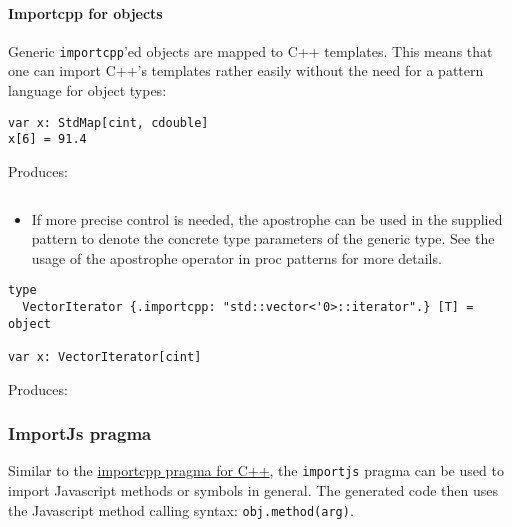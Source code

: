\hypertarget{importcpp-for-objects}{%
\paragraph{Importcpp for objects}\label{importcpp-for-objects}}

Generic \texttt{importcpp}'ed objects are mapped to C++ templates. This
means that one can import C++'s templates rather easily without the need
for a pattern language for object types:

\begin{verbatim}
var x: StdMap[cint, cdouble]
x[6] = 91.4
\end{verbatim}

Produces:

\begin{verbatim}
\end{verbatim}

\begin{itemize}
\tightlist
\item
  If more precise control is needed, the apostrophe
  \texttt{\textquotesingle{}} can be used in the supplied pattern to
  denote the concrete type parameters of the generic type. See the usage
  of the apostrophe operator in proc patterns for more details.
\end{itemize}

\begin{verbatim}
type
  VectorIterator {.importcpp: "std::vector<'0>::iterator".} [T] = object

var x: VectorIterator[cint]
\end{verbatim}

Produces:

\begin{Shaded}
\begin{Highlighting}[]
\end{Highlighting}
\end{Shaded}

\hypertarget{importjs-pragma}{%
\subsubsection{ImportJs pragma}\label{importjs-pragma}}

Similar to the
\protect\hyperlink{implementation-specific-pragmas-importcpp-pragma}{importcpp
pragma for C++}, the \texttt{importjs} pragma can be used to import
Javascript methods or symbols in general. The generated code then uses
the Javascript method calling syntax: \texttt{obj.method(arg)}.

